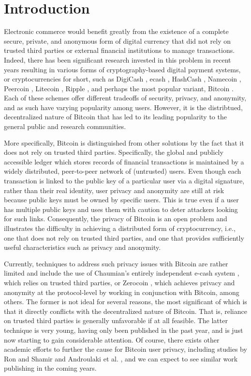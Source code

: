 \section{Introduction}

Electronic commerce would benefit greatly from the existence of a complete secure, private, and anonymous form of digital currency that did not rely on trusted third parties or external financial institutions to manage transactions. Indeed, there has been significant research invested in this problem in recent years resulting in various forms of cryptography-based digital payment systems, or cryptocurrencies for short, such as DigiCash \cite{digicash}, ecash \cite{ecash}, HashCash \cite{hashcash}, Namecoin \cite{namecoin}, Peercoin \cite{peercoin}, Litecoin \cite{litecoin}, Ripple \cite{ripple}, and perhaps the most popular variant, Bitcoin \cite{bitcoin}. Each of these schemes offer different tradeoffs of security, privacy, and anonymity, and as such have varying popularity among users. However, it is the distribtued, decentralized nature of Bitcoin that has led to its leading popularity to the general public and research communities. 

More specifically, Bitcoin is distinguished from other solutions by the fact that it does not rely on trusted third parties. Specifically, the global and publicly accessible ledger which stores records of financial transactions is maintained by a widely distributed, peer-to-peer network of (untrusted) users. Even though each transaction is linked to the public key of a particular user via a digital signature, rather than their real identity, user privacy and anonymity are still at risk because public keys must be owned by specific users. This is true even if a user has multiple public keys and uses them with caution to deter attackers looking for such links. Consequently, the privacy of Bitcoin is an open problem and illustrates the difficulty in achieving a distributed form of cryptocurrency, i.e., one that does not rely on trusted third parties, and one that provides sufficiently useful characteristics such as privacy and anonymity.

Currently, techniques to address such privacy issues with Bitcoin are rather limited and include the use of Chaumian's entirely independent e-cash system \cite{chaumain}, which relies on trusted third parties, or Zerocoin \cite{zerocoin}, which achieves privacy and anonymity at the protocol-level by working in conjunction with Bitcoin, among others. The former is not ideal for several reasons, the most significant of which is that it directly conflicts with the decentralized nature of Bitcoin. That is, reliance on trusted third parties is generally unfavorable if at all feasible. The latter technique is very young, having only been published in the past year, and is just now starting to gain considerable attention. Of course, there exists other academic efforts to further the cause for Bitcoin user privacy, including studies by Ron and Shamir \cite{Shamir13-bitcoingraph} and Androulaki et al. \cite{Androulaki12-privacy}, and we can expect to see similar work publishing in the coming years.

